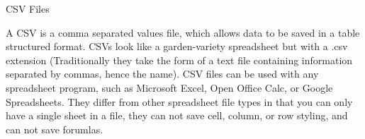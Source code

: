 CSV Files

A CSV is a comma separated values file, which allows data to be saved in a table structured format. 
CSVs look like a garden-variety spreadsheet but with a .csv extension (Traditionally they take the form of a text file containing information separated by commas, hence the name). CSV files can be used with any spreadsheet program, such as Microsoft Excel, Open Office Calc, or Google Spreadsheets. They differ from other spreadsheet file types in that you can only have a single sheet in a file, they can not save cell, column, or row styling, and can not save forumlas.
